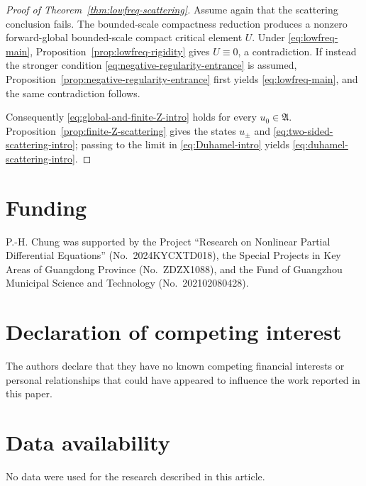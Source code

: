 \documentclass[preprint,12pt]{elsarticle}
\numberwithin{equation}{section}
\theoremstyle{remark}
\begin{document}
\begin{proof}[Proof of Theorem~\ref{thm:lowfreq-scattering}]
Assume again that the scattering conclusion fails. The bounded-scale compactness reduction produces a nonzero forward-global bounded-scale compact critical element $U$. Under \eqref{eq:lowfreq-main}, Proposition~\ref{prop:lowfreq-rigidity} gives $U\equiv0$, a contradiction. If instead the stronger condition \eqref{eq:negative-regularity-entrance} is assumed, Proposition~\ref{prop:negative-regularity-entrance} first yields \eqref{eq:lowfreq-main}, and the same contradiction follows.

Consequently \eqref{eq:global-and-finite-Z-intro} holds for every $u_0\in\mathfrak A$. Proposition~\ref{prop:finite-Z-scattering} gives the states $u_\pm$ and \eqref{eq:two-sided-scattering-intro}; passing to the limit in \eqref{eq:Duhamel-intro} yields \eqref{eq:duhamel-scattering-intro}.
\end{proof}



\section*{Funding}
P.-H. Chung was supported by the Project ``Research on Nonlinear Partial Differential Equations'' (No.~2024KYCXTD018), the Special Projects in Key Areas of Guangdong Province (No.~ZDZX1088), and the Fund of Guangzhou Municipal Science and Technology (No.~202102080428).

\section*{Declaration of competing interest}
The authors declare that they have no known competing financial interests or personal relationships that could have appeared to influence the work reported in this paper.



\section*{Data availability}
No data were used for the research described in this article.
\end{document}
